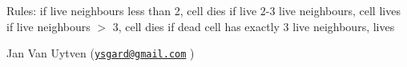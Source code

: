 Rules\-: if live neighbours less than 2, cell dies if live 2-\/3 live neighbours, cell lives if live neighbours $>$ 3, cell dies if dead cell has exactly 3 live neighbours, lives

Jan Van Uytven (\href{mailto:ysgard@gmail.com}{\tt ysgard@gmail.\-com} ) 
